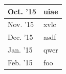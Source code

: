 \documentclass{acm_proc_article-sp}
\begin{document}
\begin{center}
  \begin{tabular}{|l|p{6.5cm}|}
    \hline
    Oct. '15 & uiae \\ \hline
    Nov. '15 & xvlc \\ \hline
    Dec. '15 & asdf \\ \hline
    Jan. '15 & qwer \\ \hline
    Feb. '15 & foo \\
    \hline
  \end{tabular}
\end{center}

\printbibliography

\balancecolumns
\end{document}
